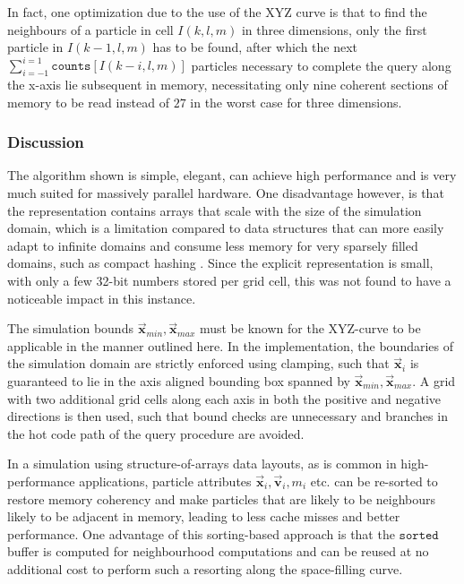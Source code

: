 \documentclass[oneside, a4paper]{book}
\newcommand\vek[1]{\vec{\bm{#1}}}
\begin{document}
\begin{appendices}
    In fact, one optimization due to the use of the XYZ curve is that to find the neighbours of a particle in cell $I(k,l,m)$ in three dimensions, only the first particle in $I(k-1, l, m)$ has to be found, after which the next $\sum_{i=-1}^{i=1}\texttt{counts}[I(k-i,l,m)]$ particles necessary to complete the query along the x-axis lie subsequent in memory, necessitating only nine coherent sections of memory to be read instead of $27$ in the worst case for three dimensions.

    \subsubsection{Discussion}
    The algorithm shown \autocite{hoetzlein-rama-counting-sort} is simple, elegant, can achieve high performance and is very much suited for massively parallel hardware. One disadvantage however, is that the representation contains arrays that scale with the size of the simulation domain, which is a limitation compared to data structures that can more easily adapt to infinite domains and consume less memory for very sparsely filled domains, such as compact hashing \autocites{tutorial2019}{compressed-neighbour-lists}. Since the explicit representation is small, with only a few 32-bit numbers stored per grid cell, this was not found to have a noticeable impact in this instance.

    The simulation bounds $\vek{x}_{min},\vek{x}_{max}$ must be known for the XYZ-curve to be applicable in the manner outlined here. In the implementation, the boundaries of the simulation domain are strictly enforced using clamping, such that $\vek{x}_i$ is guaranteed to lie in the axis aligned bounding box spanned by $\vek{x}_{min},\vek{x}_{max}$. A grid with two additional grid cells along each axis in both the positive and negative directions is then used, such that bound checks are unnecessary and branches in the hot code path of the query procedure are avoided.
    
    In a simulation using structure-of-arrays data layouts, as is common in high-performance applications, particle attributes $\vek{x}_i, \vek{v}_i, m_i$ etc. can be re-sorted to restore memory coherency and make particles that are likely to be neighbours likely to be adjacent in memory, leading to less cache misses and better performance. One advantage of this sorting-based approach is that the $\texttt{sorted}$ buffer is computed for neighbourhood computations and can be reused at no additional cost to perform such a resorting along the space-filling curve.


\end{appendices}
\end{document}
